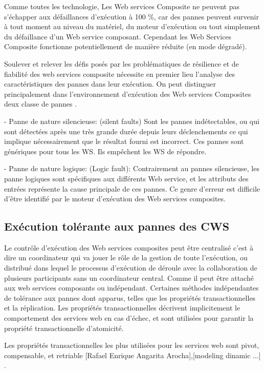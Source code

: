 Comme toutes les technologie, Les Web services Composite ne peuvent pas s’échapper aux défaillances d’exécution à 100 \%, car des pannes peuvent survenir à tout moment au niveau du matériel, du moteur d’exécution ou tout simplement du défaillance d’un Web service composant.
Cependant les Web Services Composite fonctionne potentiellement de manière réduite (en mode dégradé).


Soulever et relever les défis posés par les problématiques de résilience et de fiabilité des web services composite nécessite en premier lieu l’analyse  des caractéristiques des pannes dans  leur exécution.
On peut distinguer principalement dans l’environnement d’exécution des Web services Composites deux classe de pannes \cite{2}. 

    - Panne de nature silencieuse: (silent faults) Sont les pannes indétectables, ou qui sont détectées après une très grande durée depuis leurs déclenchements ce qui implique nécessairement que le résultat fourni est incorrect. 
    Ces pannes sont génériques pour tous les WS. Ils empêchent les WS de répondre.


    - Panne de nature logique: (Logic fault): Contrairement au pannes silencieuse, les panne logiques sont spécifiques aux différents Web service, et les attributs des entrées représente la cause principale de ces pannes.
    Ce genre d’erreur est difficile d’être identifié par le moteur d’exécution des Web services composites.

\subsection{Exécution tolérante aux pannes des CWS}

Le contrôle d'exécution des Web services composites peut être centralisé c’est à dire un coordinateur qui va jouer le rôle de la gestion de toute l’exécution,  ou distribué dans lequel le processus d’exécution de déroule avec la collaboration de plusieurs participants sans un coordinateur central. Comme il peut être attaché aux web services composants ou indépendant.
Certaines méthodes indépendantes de tolérance aux pannes dont apparus, telles que les propriétés transactionnelles et la réplication. Les propriétés transactionnelles décrivent implicitement le comportement des services web en cas d'échec, et sont utilisées pour garantir la propriété transactionnelle d’atomicité.

Les propriétés transactionnelles les plus utilisées pour les services web sont pivot, compensable, et retriable [Rafael Enrique Angarita Arocha],[modeling dinamic ...] \cite{1}. 
 
